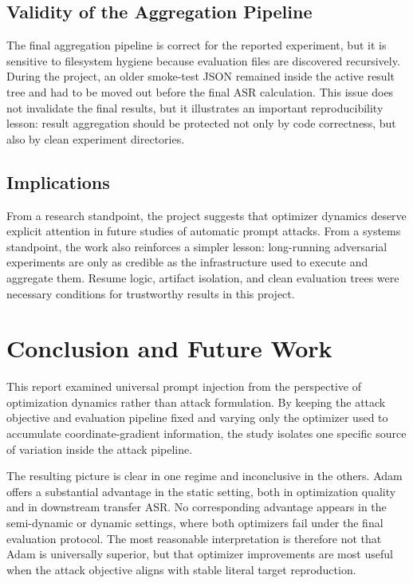 \documentclass[12pt,a4paper]{report}
\begin{document}
\section{Validity of the Aggregation Pipeline}
The final aggregation pipeline is correct for the reported experiment, but it is sensitive to filesystem hygiene because evaluation files are discovered recursively. During the project, an older smoke-test JSON remained inside the active result tree and had to be moved out before the final ASR calculation. This issue does not invalidate the final results, but it illustrates an important reproducibility lesson: result aggregation should be protected not only by code correctness, but also by clean experiment directories.

\section{Implications}
From a research standpoint, the project suggests that optimizer dynamics deserve explicit attention in future studies of automatic prompt attacks. From a systems standpoint, the work also reinforces a simpler lesson: long-running adversarial experiments are only as credible as the infrastructure used to execute and aggregate them. Resume logic, artifact isolation, and clean evaluation trees were necessary conditions for trustworthy results in this project.

\chapter{Conclusion and Future Work}
This report examined universal prompt injection from the perspective of optimization dynamics rather than attack formulation. By keeping the attack objective and evaluation pipeline fixed and varying only the optimizer used to accumulate coordinate-gradient information, the study isolates one specific source of variation inside the attack pipeline.

The resulting picture is clear in one regime and inconclusive in the others. Adam offers a substantial advantage in the static setting, both in optimization quality and in downstream transfer ASR. No corresponding advantage appears in the semi-dynamic or dynamic settings, where both optimizers fail under the final evaluation protocol. The most reasonable interpretation is therefore not that Adam is universally superior, but that optimizer improvements are most useful when the attack objective aligns with stable literal target reproduction.
\end{document}
